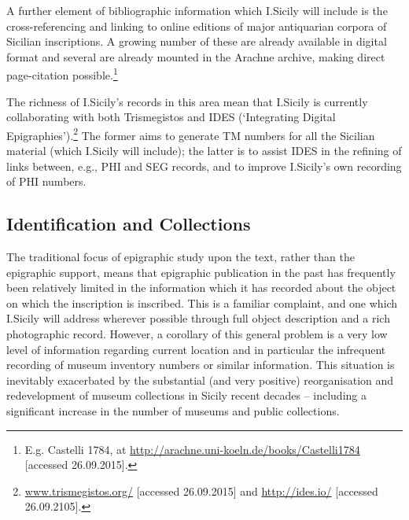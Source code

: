 \documentclass[amsthm,ebook]{saparticle}
\begin{document}
A further element of bibliographic information which I.Sicily will include is the cross-referencing and linking to
online editions of major antiquarian corpora of Sicilian inscriptions. A growing number of these are already available
in digital format and several are already mounted in the Arachne archive, making direct page-citation
possible.\footnote{ E.g. Castelli 1784, at \url{http://arachne.uni-koeln.de/books/Castelli1784} [accessed 26.09.2015].}

The richness of I.Sicily’s records in this area mean that I.Sicily is currently collaborating with both Trismegistos and
IDES (`Integrating Digital Epigraphies').\footnote{\url{www.trismegistos.org/} [accessed 26.09.2015] and \url{http://ides.io/}
[accessed 26.09.2105].} The former aims to generate TM numbers for all the Sicilian material (which I.Sicily will
include); the latter is to assist IDES in the refining of links between, e.g., PHI and SEG records, and to improve
I.Sicily’s own recording of PHI numbers.




\subsection{Identification and Collections}


The traditional focus of epigraphic study upon the text, rather than the epigraphic support, means that epigraphic
publication in the past has frequently been relatively limited in the information which it has recorded about the
object on which the inscription is inscribed. This is a familiar complaint, and one which I.Sicily will address
wherever possible through full object description and a rich photographic record. However, a corollary of this general
problem is a very low level of information regarding current location and in particular the infrequent recording of
museum inventory numbers or similar information. This situation is inevitably exacerbated by the substantial (and very
positive) reorganisation and redevelopment of museum collections in Sicily recent decades – including a significant
increase in the number of museums and public collections.
\end{document}

